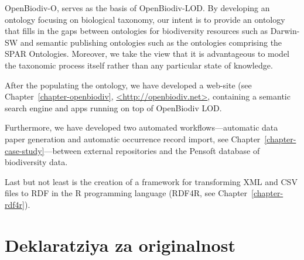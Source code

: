 OpenBiodiv-O, serves as the basis of OpenBiodiv-LOD. By developing an ontology focusing on biological taxonomy, our intent is to provide an ontology that fills in the gaps between ontologies for biodiversity resources such as Darwin-SW and semantic publishing ontologies such as the ontologies comprising the SPAR Ontologies. Moreover, we take the view that it is advantageous to model the taxonomic process itself rather than any particular state of knowledge.

After the populating the ontology, we have developed a web-site (see Chapter~\ref{chapter-openbiodiv}, \href{http://openbiodiv.net}{<http://openbiodiv.net>}, containing a semantic search engine and apps running on top of OpenBiodiv LOD.

Furthermore, we have developed two automated workflows---automatic data paper generation and automatic occurrence record import, see Chapter~\ref{chapter-case-study}---between external repositories and the Pensoft database of biodiversity data.

Last but not least is the creation of a framework for transforming XML and CSV files to RDF in the R programming language (RDF4R, see Chapter~\ref{chapter-rdf4r}).

\section{Deklaratziya za originalnost}